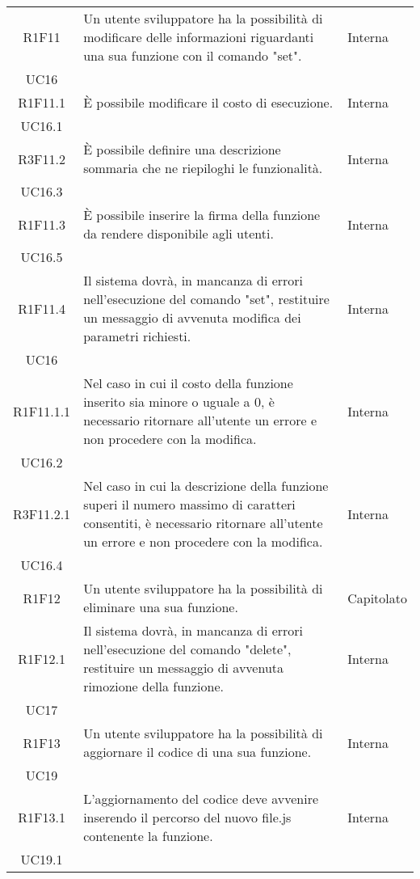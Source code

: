 \begin{longtable}{|c|p{8cm}|C{2cm}|}
	R1F11 &  Un utente sviluppatore ha la possibilità di modificare delle informazioni riguardanti una sua funzione con il comando "set". & \centering Interna \\ UC16 \tabularnewline
	
	R1F11.1 &  È possibile modificare il costo di esecuzione. & \centering Interna \\ UC16.1 \tabularnewline
	
	R3F11.2 &  È possibile definire una descrizione sommaria che ne riepiloghi le funzionalità. & \centering Interna \\ UC16.3 \tabularnewline
	
	R1F11.3 &  È possibile inserire la firma della funzione da rendere disponibile agli utenti. & \centering Interna \\ UC16.5 \tabularnewline
	
	R1F11.4 &  Il sistema dovrà, in mancanza di errori nell'esecuzione del comando "set", restituire un messaggio di avvenuta modifica dei parametri richiesti. & \centering Interna \\ UC16 \tabularnewline
	
	R1F11.1.1 &  Nel caso in cui il costo della funzione inserito sia minore o uguale a 0, è necessario ritornare all'utente un errore e non procedere con la modifica. & \centering Interna \\ UC16.2 \tabularnewline
	
	R3F11.2.1 &  Nel caso in cui la descrizione della funzione superi il numero massimo di caratteri consentiti, è necessario ritornare all'utente un errore e non procedere con la modifica. & \centering Interna \\ UC16.4 \tabularnewline
	
	R1F12 &  Un utente sviluppatore ha la possibilità di eliminare una sua funzione. & Capitolato \\
	
	R1F12.1 & Il sistema dovrà, in mancanza di errori nell'esecuzione del comando "delete", restituire un messaggio di avvenuta rimozione della funzione. & \centering Interna \\ UC17 \tabularnewline
	
	R1F13 &  Un utente sviluppatore ha la possibilità di aggiornare il codice di una sua funzione. & \centering Interna \\ UC19 \tabularnewline
	
	R1F13.1 &  L'aggiornamento del codice deve avvenire inserendo il percorso del nuovo file.js contenente la funzione. & \centering Interna \\ UC19.1 \tabularnewline
	

\end{longtable}
